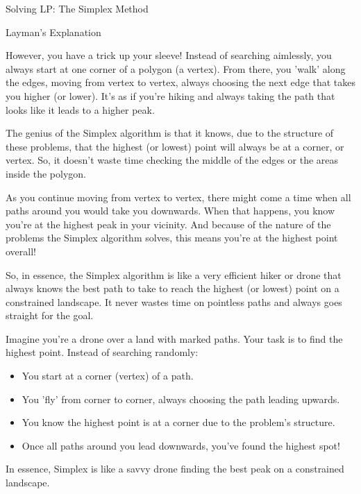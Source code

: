 \documentclass[
    NAME={Dr. Helga Ingimundardóttir},
    EMAIL={helgaingim@hi.is},
    FACULTY={Industrial Engineering},
    TITLE={Linear Optimization},
    SUBTITLE={Fundamentals and Applications},
    SEMINAR={VÉL113F},
    DATE={Design and Optimization}
]{HI-latex/hi-beamer}
\begin{document}
\begin{frame}[allowframebreaks]{Solving LP: The Simplex Method}
\begin{block}{Layman's Explanation}
{            However, you have a trick up your sleeve! Instead of searching aimlessly, you always start at one corner
            of a polygon (a vertex). From there, you 'walk' along the edges, moving from vertex to vertex, always
            choosing the next edge that takes you higher (or lower). It's as if you're hiking and always taking the
            path that looks like it leads to a higher peak.

            The genius of the Simplex algorithm is that it knows, due to the structure of these problems, that the
            highest (or lowest) point will always be at a corner, or vertex. So, it doesn't waste time checking the
            middle of the edges or the areas inside the polygon.

            As you continue moving from vertex to vertex, there might come a time when all paths around you would
            take you downwards. When that happens, you know you're at the highest peak in your vicinity. And because
            of the nature of the problems the Simplex algorithm solves, this means you're at the highest point
            overall!

            So, in essence, the Simplex algorithm is like a very efficient hiker or drone that always knows the best
            path to take to reach the highest (or lowest) point on a constrained landscape. It never wastes time on
            pointless paths and always goes straight for the goal.
            }

            Imagine you're a drone over a land with marked paths. Your task is to find the highest point. Instead of
            searching randomly:

            \begin{itemize}
                \item You start at a corner (vertex) of a path.
                \item You 'fly' from corner to corner, always choosing the path leading upwards.
                \item You know the highest point is at a corner due to the problem's structure.
                \item Once all paths around you lead downwards, you've found the highest spot!
            \end{itemize}

            In essence, Simplex is like a savvy drone finding the best peak on a constrained landscape.
        \end{block}
    \end{frame}
\end{document}
